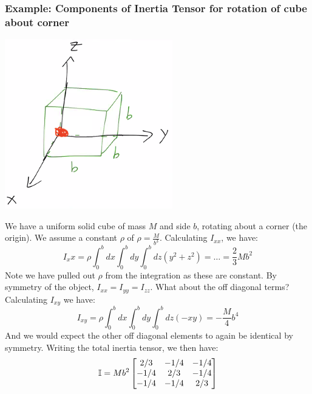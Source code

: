 \documentclass[../PHYS306Notes.tex]{subfiles}
\begin{document}
\subsubsection{Example: Components of Inertia Tensor for rotation of cube about corner}
\begin{center}
    \includegraphics[scale=1]{Lecture-18/l18-img3.png}
\end{center}
We have a uniform solid cube of mass $M$ and side $b$, rotating about a corner (the origin). We assume a constant $\rho$ of $\rho = \frac{M}{b^3}$. Calculating $I_{xx}$, we have:
\[I_xx = \rho\int_0^bdx \int_0^bdy \int_0^bdz (y^2 + z^2) = \ldots = \frac{2}{3}Mb^2\]
Note we have pulled out $\rho$ from the integration as these are constant. By symmetry of the object, $I_{xx} = I_{yy} = I_{zz}$. What about the off diagonal terms? Calculating $I_{xy}$ we have:
\[I_{xy} = \rho\int_0^bdx\int_0^bdy\int_0^bdz(-xy) = -\frac{M}{4}b^4\]
And we would expect the other off diagonal elements to again be identical by symmetry. Writing the total inertia tensor, we then have:
\[\mathbb{I} = Mb^2\begin{bmatrix}2/3 & -1/4 & -1/4 \\ -1/4 & 2/3 & -1/4 \\ -1/4 & -1/4 & 2/3\end{bmatrix}\]
\end{document}
